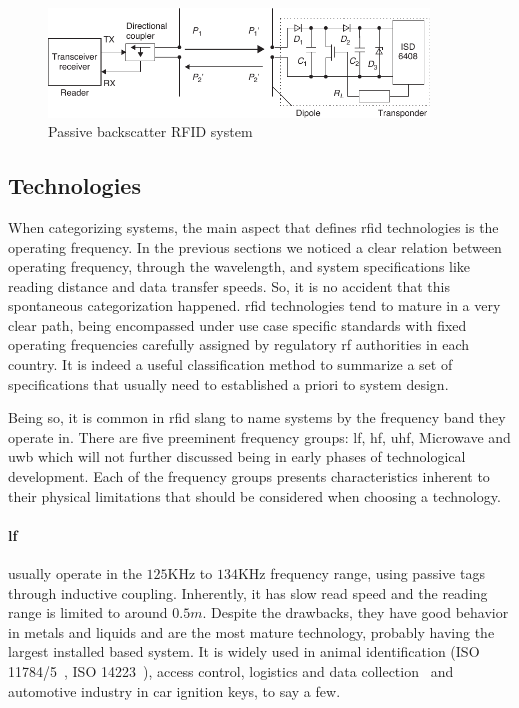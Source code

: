 \begin{figure}[!ht]
    \centering
    \includegraphics[width=0.9\textwidth]{./figs/02-state-of-the-art/backscatter.pdf}
    \caption{Passive backscatter RFID system~\cite{finkenzellerRFIDHandbookFundamentals2003}} 
    \label{fig:backscatter}
\end{figure}

\subsection{Technologies} \label{sec:opfrequency}

When categorizing systems, the main aspect that defines \ac{rfid} technologies is the operating frequency.
In the previous sections we noticed a clear relation between operating frequency, through the wavelength, and system specifications like reading distance and data transfer speeds.
So, it is no accident that this spontaneous categorization happened. \ac{rfid} technologies tend to mature in a very clear path, being encompassed under use case specific standards with fixed operating frequencies carefully assigned by regulatory \ac{rf} authorities in each country. 
It is indeed a useful classification method to summarize a set of specifications that usually need to established a priori to system design.

Being so, it is common in \ac{rfid} slang to name systems by the frequency band they operate in.
There are five preeminent frequency groups: \ac{lf}, \ac{hf}, \ac{uhf}, Microwave and \ac{uwb} which will not further discussed being in early phases of technological development.
Each of the frequency groups presents characteristics inherent to their physical limitations that should be considered when choosing a technology.

\paragraph*{\ac{lf}} usually operate in the $125$KHz to $134$KHz frequency range, using passive tags through inductive coupling. Inherently, it has slow read speed and the reading range is limited to around $0.5m$. Despite the drawbacks, they have good behavior in metals and liquids and are the most mature technology, probably having the largest installed based system.
It is widely used in animal identification (ISO 11784/5~\cite{isoISO117841996, isoISO117851996}, ISO 14223~\cite{isoISO1422332018}), access control, logistics and data collection~\cite{isoISOIEC180002} and automotive industry in car ignition keys, to say a few.

